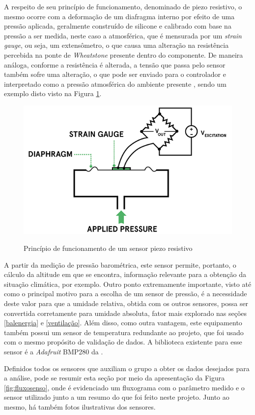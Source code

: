 \documentclass[acronym,symbols,table]{fei}
\begin{document}
A respeito de seu princípio de funcionamento, denominado de piezo resistivo, o mesmo ocorre com a deformação de um diafragma interno por efeito de uma pressão aplicada, geralmente construído de silicone e calibrado com base na pressão a ser medida, neste caso a atmosférica, que é mensurada por um \textit{strain gauge}, ou seja, um extensômetro, o que causa uma alteração na resistência percebida na ponte de \textit{Wheatstone} presente dentro do componente. De maneira análoga, conforme a resistência é alterada, a tensão que passa pelo sensor também sofre uma alteração, o que pode ser enviado para o controlador e interpretado como a pressão atmosférica do ambiente presente \cite{piezo}, sendo um exemplo disto visto na Figura \ref{fig:piezoresist}.

\begin{figure}[!htb]
\centering
    \caption{Princípio de funcionamento de um sensor piezo resistivo}
    \includegraphics[width=0.4\linewidth]{Imagens/piezoresist.jpg}
    \label{fig:piezoresist}
\end{figure}

A partir da medição de pressão barométrica, este sensor permite, portanto, o cálculo da altitude em que se encontra, informação relevante para a obtenção da situação climática, por exemplo. Outro ponto extremamente importante, visto até como o principal motivo para a escolha de um sensor de pressão, é a necessidade deste valor para que a umidade relativa, obtida com os outros sensores, possa ser convertida corretamente para umidade absoluta, fator mais explorado nas seções \ref{balenergia} e \ref{ventilação}. Além disso, como outra vantagem, este equipamento também possui um sensor de temperatura redundante ao projeto, que foi usado com o mesmo propósito de validação de dados. A biblioteca existente para esse sensor é a \textit{Adafruit} BMP280 da \textcite{Adafruit_BMP280}. 

Definidos todos os sensores que auxiliam o grupo a obter os dados desejados para a análise, pode se resumir esta seção por meio da apresentação da Figura \ref{fig:fluxosenso}, onde é evidenciado um fluxograma com o parâmetro medido e o sensor utilizado junto a um resumo do que foi feito neste projeto. Junto ao mesmo, há também fotos ilustrativas dos sensores.
\end{document}

